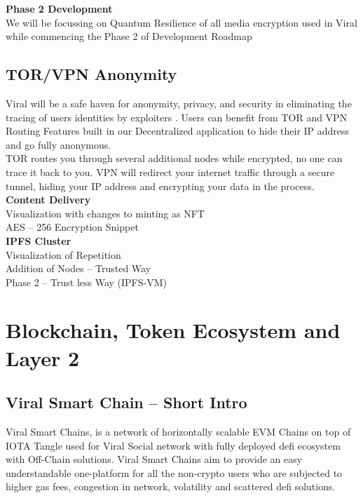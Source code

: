 \documentclass[10pt]{article}
\begin{document}
\textbf{Phase 2 Development}\\

We will be focussing on Quantum Resilience of all media encryption used in Viral while commencing the Phase 2 of Development Roadmap\\

\subsection{TOR/VPN Anonymity}

Viral will be a safe haven for anonymity, privacy, and security in eliminating the tracing of users\textsc{} identities by exploiters . Users can benefit from TOR and VPN Routing Features built in our Decentralized application to hide their IP address and go fully anonymous.\\

TOR routes you through several additional nodes while encrypted, no one can trace it back to you. VPN will redirect your internet traffic through a secure tunnel, hiding your IP address and encrypting your data in the process.\\

\textbf{Content Delivery}\\

Visualization with changes to minting as NFT\\

AES – 256 Encryption Snippet\\

\textbf{IPFS Cluster}\\

Visualization of Repetition\\

Addition of Nodes – Trusted Way\\

Phase 2 – Trust less Way (IPFS-VM)\\

\section{Blockchain, Token Ecosystem and Layer 2}

\subsection{Viral Smart Chain – Short Intro}

Viral Smart Chains, is a network of horizontally scalable EVM Chains on top of IOTA Tangle used for Viral Social network with fully deployed defi ecosystem with Off-Chain solutions. Viral Smart Chains aim to provide an easy understandable one-platform for all the non-crypto users who are subjected to higher gas fees, congestion in network, volatility and scattered defi solutions.\\
\end{document}
